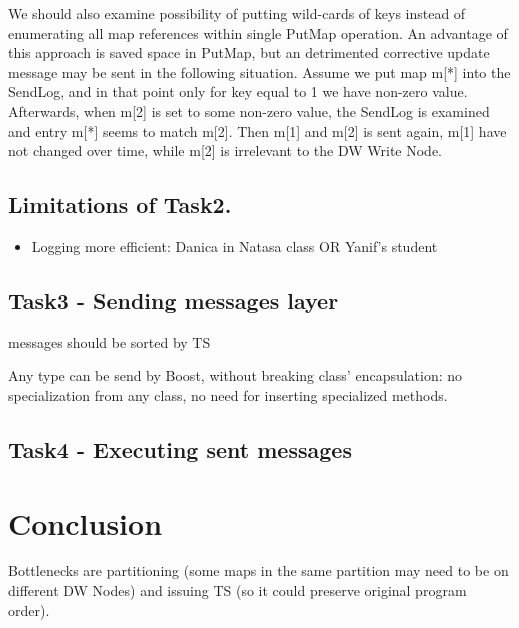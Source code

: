 \documentclass{sig-semester}
\begin{document}
We should also examine possibility of putting wild-cards of keys instead of enumerating all map references within single PutMap operation. An advantage of this approach is saved space in PutMap, but an detrimented corrective update message may be sent in the following situation. Assume we put map m[*] into the SendLog, and in that point only for key equal to 1 we have non-zero value. Afterwards, when m[2] is set to some non-zero value, the SendLog is examined and entry m[*] seems to match m[2]. Then m[1] and m[2] is sent again, m[1] have not changed over time, while m[2] is irrelevant to the DW Write Node.

\subsection{Limitations of Task2. }
\begin{itemize}
 \item Logging more efficient: Danica in Natasa class OR Yanif's student 
\end{itemize}

\subsection{Task3 - Sending messages layer }
messages should be sorted by TS

Any type can be send by Boost, without breaking class' encapsulation: no specialization from any class, no need for inserting specialized methods.

\subsection {Task4 - Executing sent messages }

\section{Conclusion}
\vspace{2mm}
Bottlenecks are partitioning (some maps in the same partition may need to be on different DW Nodes) and issuing TS (so it could preserve original program order).

%
%

\newpage
\end{document}
